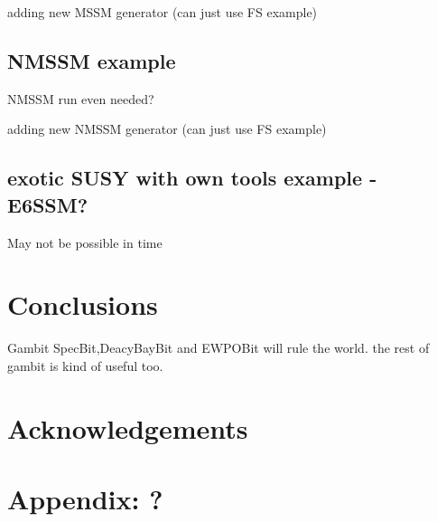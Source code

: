 \documentclass[11pt,a4paper]{article}
\begin{document}
adding new MSSM generator (can just use FS example)
\subsection{NMSSM example}
NMSSM run even needed?

adding new NMSSM generator (can just use FS example)
\subsection{exotic SUSY with own tools example - E6SSM?}
May not be possible in time

\section{Conclusions}
Gambit SpecBit,DeacyBayBit and EWPOBit will rule the world.  the rest of gambit is kind of useful too.
\section{Acknowledgements}

\section{Appendix: ?}
\end{document}
